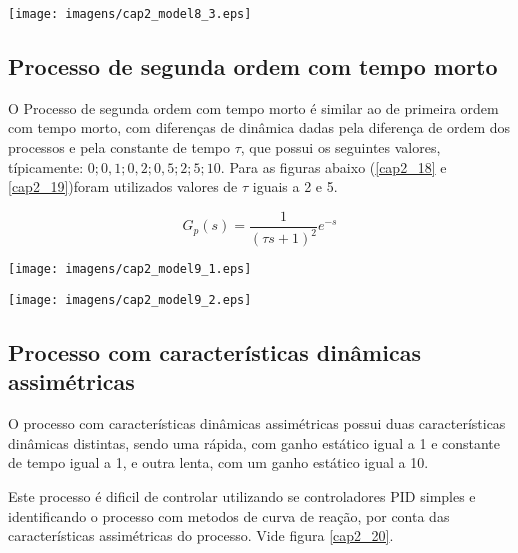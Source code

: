     \begin{center}
        \texttt{[image: imagens/cap2\_model8\_3.eps]}
    \end{center}

\subsection{Processo de segunda ordem com tempo morto}
    
    O Processo de segunda ordem com tempo morto é similar ao de primeira ordem
    com tempo morto, com diferenças de dinâmica dadas pela diferença de ordem
    dos processos e pela constante de tempo $\tau$, que possui os seguintes valores,
    típicamente: $0; 0,1; 0,2; 0,5; 2; 5; 10$. Para as figuras abaixo
    (\ref{cap2_18} e \ref{cap2_19})foram utilizados valores de $\tau$ iguais
    a 2 e 5.
    
    \begin{equation}
        G_p(s) = \frac{1}{(\tau s +1)^2}e^{-s}
    \end{equation}

    \begin{center}
        \texttt{[image: imagens/cap2\_model9\_1.eps]}
        \label{cap2_18}
    \end{center}
    
    \begin{center}
        \texttt{[image: imagens/cap2\_model9\_2.eps]}
        \label{cap2_19}
    \end{center}

\subsection{Processo com características dinâmicas assimétricas}
    
    O processo com características dinâmicas assimétricas possui duas características
    dinâmicas distintas, sendo uma rápida, com ganho estático igual a 1 e constante
    de tempo igual a 1, e outra lenta, com um ganho estático igual a 10.
    
    Este processo é dificil de controlar utilizando se controladores \acs{PID}
    simples e identificando o processo com metodos de curva de reação, por conta das
    características assimétricas do processo. Vide figura \ref{cap2_20}.
    
